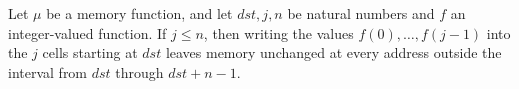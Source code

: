 \begin{theorem}
\label{Light.sameOutside_wrote}
\leanok
{}
Let $\mu$ be a memory function, and let $dst,j,n$ be natural numbers and $f$ an
integer-valued function. If $j\le n$, then writing the values $f(0),\ldots,f(j-1)$ into
the $j$ cells starting at $dst$ leaves memory unchanged at every address outside the
interval from $dst$ through $dst+n-1$.
\end{theorem}
